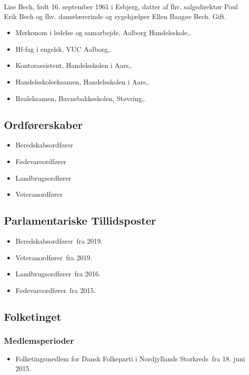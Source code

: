 \documentclass[11pt, a4paper]{awesome-cv}
\begin{document}
\makecvheader[R]
\makelettertitle
\begin{cvletter}
Lise Bech, født 16. september 1961 i Esbjerg, datter af fhv. salgsdirektør Poul Erik Bech og fhv. danselærerinde og sygehjælper Ellen Baagøe Bech. Gift. 

\begin{itemize}
\item Merkonom i ledelse og samarbejde, Aalborg Handelsskole,.
\item Hf-fag i engelsk, VUC Aalborg,.
\item Kontorassistent, Handelsskolen i Aars,.
\item Handelsskoleeksamen, Handelsskolen i Aars,.
\item Realeksamen, Bavnebakkeskolen, Støvring,.
\end{itemize}
\subsection*{Ordførerskaber}
\begin{itemize}
\item Beredskabsordfører
\item Fødevareordfører
\item Landbrugsordfører
\item Veteranordfører
\end{itemize}
\subsection*{Parlamentariske Tillidsposter}
\begin{itemize}
\item Beredskabsordfører fra 2019.
\item Veteranordfører fra 2019.
\item Landbrugsordfører fra 2016.
\item Fødevareordfører fra 2015.
\end{itemize}
\subsection*{Folketinget}
\subsubsection*{Medlemsperioder}
\begin{itemize}
\item Folketingsmedlem for Dansk Folkeparti i Nordjyllands Storkreds fra 18. juni 2015.
\end{itemize}

\end{cvletter}
\end{document}
